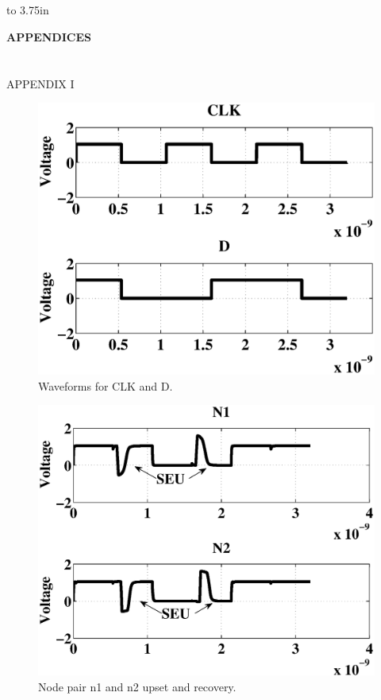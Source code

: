 

\chapter*{}

\thispagestyle{empty}

\vbox to 3.75in{}
\begin{center}
{\textbf{APPENDICES}}
\vfill
\end{center}

\addtocounter{page}{-1}
\newpage


\chapter*{}\label{Ap1}
\begin{center}
APPENDIX I
\end{center}

\begin{figure}[!htbp]
	\centering
	\includegraphics[width=0.55\linewidth]{Figures/WavePlots/CLKD.eps}
	\caption{Waveforms for CLK and D.}
	\label{fig:CLK}
\end{figure}

\begin{figure}[!htbp]
	\centering
	\includegraphics[width=0.5\linewidth]{Figures/WavePlots/n1n2.eps}
	\caption{Node pair n1 and n2 upset and recovery.}
	\label{fig:n1n2}
\end{figure}

